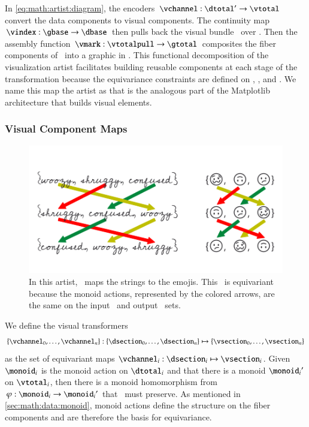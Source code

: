 \documentclass[journal]{vgtc}                %
\begin{document}
In \autoref{eq:math:artist:diagram}, the encoders $\vchannel:\dtotal^{\prime} \rightarrow \vtotal$ convert the data components to visual components. The continuity map $\vindex:\gbase \rightarrow \dbase$ then pulls back the visual bundle \vtotal\ over \gbase. Then the assembly function $\vmark: \vtotalpull \rightarrow \gtotal$ composites the fiber components of \vtotalpull\ into a graphic in \gtotal. This functional decomposition of the visualization artist facilitates building reusable components at each stage of the transformation because the equivariance constraints are defined on \vchannel, \vmark, and \vindex. We name this map the artist as that is the analogous part of the  Matplotlib\cite{hunterArchitectureOpenSource} architecture that builds visual elements.

\subsubsection{Visual Component Maps}
\label{sec:math:artist:nu}
\begin{figure}[htb]
  \centering
  \includegraphics[width=\columnwidth]{equivariance_nu.png}
  \caption{In this artist, \vchannel\ maps the strings to the emojis. This \vchannel\ is equivariant because the monoid actions, represented by the colored arrows, are the same on the input \dsection\ and output \vsection\ sets.}
  \label{fig:math:artist:nu}
\end{figure}
 We define the visual transformers \vchannel\ 
\begin{equation}
  \label{eq:math:artist:nu}
  \{\vchannel_{0}, \ldots, \vchannel_{n}\}: \{\dsection_{0}, \ldots, \dsection_{n}\} \mapsto \{\vsection_{0}, \ldots, \vsection_{n}\}
\end{equation}
as the set of equivariant maps $\vchannel_i: \dsection_i \mapsto \vsection_i$. Given $\monoid_i$ is the monoid action on $\dtotal_i$ and that there is a monoid ${\monoid_i}^{\prime}$ on $\vtotal_i$, then there is a monoid homomorphism from $\varphi:\monoid_i \rightarrow {\monoid_i}^{\prime}$ that \vchannel\ must preserve. As mentioned in \autoref{sec:math:data:monoid}, monoid actions define the structure on the fiber components and are therefore the basis for equivariance. 
\end{document}
